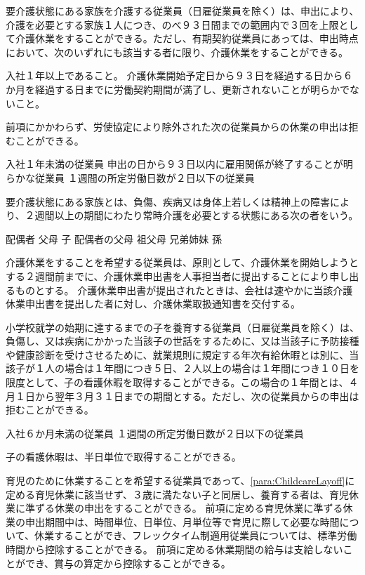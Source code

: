 \documentclass[10pt,a4paper,uplatex]{jsarticle}
\begin{document}
要介護状態にある家族を介護する従業員（日雇従業員を除く）は、申出により、介護を必要とする家族１人につき、のべ９３日間までの範囲内で３回を上限として介護休業をすることができる。ただし、有期契約従業員にあっては、申出時点において、次のいずれにも該当する者に限り、介護休業をすることができる。
\label{para:NursingLayoff}
\begin{enumerate}
    \itm 入社１年以上であること。
    \itm 介護休業開始予定日から９３日を経過する日から６か月を経過する日までに労働契約期間が満了し、更新されないことが明らかでないこと。
\end{enumerate}
\term 前項にかかわらず、労使協定により除外された次の従業員からの休業の申出は拒むことができる。
\begin{enumerate}
    \itm 入社１年未満の従業員
    \itm 申出の日から９３日以内に雇用関係が終了することが明らかな従業員
    \itm １週間の所定労働日数が２日以下の従業員
\end{enumerate}
\term 要介護状態にある家族とは、負傷、疾病又は身体上若しくは精神上の障害により、２週間以上の期間にわたり常時介護を必要とする状態にある次の者をいう。
\begin{enumerate}
    \itm 配偶者
    \itm 父母
    \itm 子
    \itm 配偶者の父母
    \itm 祖父母
    \itm 兄弟姉妹
    \itm 孫
\end{enumerate}
\term 介護休業をすることを希望する従業員は、原則として、介護休業を開始しようとする２週間前までに、介護休業申出書を人事担当者に提出することにより申し出るものとする。
\term 介護休業申出書が提出されたときは、会社は速やかに当該介護休業申出書を提出した者に対し、介護休業取扱通知書を交付する。

小学校就学の始期に達するまでの子を養育する従業員（日雇従業員を除く）は、負傷し、又は疾病にかかった当該子の世話をするために、又は当該子に予防接種や健康診断を受けさせるために、就業規則に規定する年次有給休暇とは別に、当該子が１人の場合は１年間につき５日、２人以上の場合は１年間につき１０日を限度として、子の看護休暇を取得することができる。この場合の１年間とは、４月１日から翌年３月３１日までの期間とする。ただし、次の従業員からの申出は拒むことができる。
\label{para:ChildNursingAbsence}
\begin{enumerate}
    \itm 入社６か月未満の従業員
    \itm １週間の所定労働日数が２日以下の従業員
\end{enumerate}
\term 子の看護休暇は、半日単位で取得することができる。

育児のために休業することを希望する従業員であって、\ref{para:ChildcareLayoff}に定める育児休業に該当せず、３歳に満たない子と同居し、養育する者は、育児休業に準ずる休業の申出をすることができる。
\term
前項に定める育児休業に準ずる休業の申出期間中は、時間単位、日単位、月単位等で育児に際して必要な時間について、休業することができ、フレックタイム制適用従業員については、標準労働時間から控除することができる。
\term
前項に定める休業期間の給与は支給しないことができ、賞与の算定から控除することができる。
\end{document}

